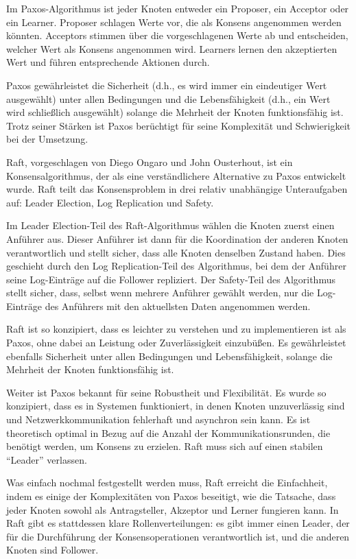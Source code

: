Im Paxos-Algorithmus ist jeder Knoten entweder ein Proposer, ein Acceptor oder ein Learner. Proposer schlagen Werte vor, die als Konsens angenommen werden könnten. Acceptors stimmen über die vorgeschlagenen Werte ab und entscheiden, welcher Wert als Konsens angenommen wird. Learners lernen den akzeptierten Wert und führen entsprechende Aktionen durch.

Paxos gewährleistet die Sicherheit (d.h., es wird immer ein eindeutiger Wert ausgewählt) unter allen Bedingungen und die Lebensfähigkeit (d.h., ein Wert wird schließlich ausgewählt) solange die Mehrheit der Knoten funktionsfähig ist. Trotz seiner Stärken ist Paxos berüchtigt für seine Komplexität und Schwierigkeit bei der Umsetzung.

Raft, vorgeschlagen von Diego Ongaro und John Ousterhout, ist ein Konsensalgorithmus, der als eine verständlichere Alternative zu Paxos entwickelt wurde. Raft teilt das Konsensproblem in drei relativ unabhängige Unteraufgaben auf: Leader Election, Log Replication und Safety.

Im Leader Election-Teil des Raft-Algorithmus wählen die Knoten zuerst einen Anführer aus. Dieser Anführer ist dann für die Koordination der anderen Knoten verantwortlich und stellt sicher, dass alle Knoten denselben Zustand haben. Dies geschieht durch den Log Replication-Teil des Algorithmus, bei dem der Anführer seine Log-Einträge auf die Follower repliziert. Der Safety-Teil des Algorithmus stellt sicher, dass, selbst wenn mehrere Anführer gewählt werden, nur die Log-Einträge des Anführers mit den aktuellsten Daten angenommen werden.

Raft ist so konzipiert, dass es leichter zu verstehen und zu implementieren ist als Paxos, ohne dabei an Leistung oder Zuverlässigkeit einzubüßen. Es gewährleistet ebenfalls Sicherheit unter allen Bedingungen und Lebensfähigkeit, solange die Mehrheit der Knoten funktionsfähig ist.


Weiter ist Paxos bekannt für seine Robustheit und Flexibilität. Es wurde so konzipiert, dass es in Systemen funktioniert, in denen Knoten unzuverlässig sind und Netzwerkkommunikation fehlerhaft und asynchron sein kann. Es ist theoretisch optimal in Bezug auf die Anzahl der Kommunikationsrunden, die benötigt werden, um Konsens zu erzielen. Raft muss sich auf einen stabilen \enquote{Leader} verlassen. 

Was einfach nochmal festgestellt werden muss, Raft erreicht die Einfachheit, indem es einige der Komplexitäten von Paxos beseitigt, wie die Tatsache, dass jeder Knoten sowohl als Antragsteller, Akzeptor und Lerner fungieren kann. In Raft gibt es stattdessen klare Rollenverteilungen: es gibt immer einen Leader, der für die Durchführung der Konsensoperationen verantwortlich ist, und die anderen Knoten sind Follower.

